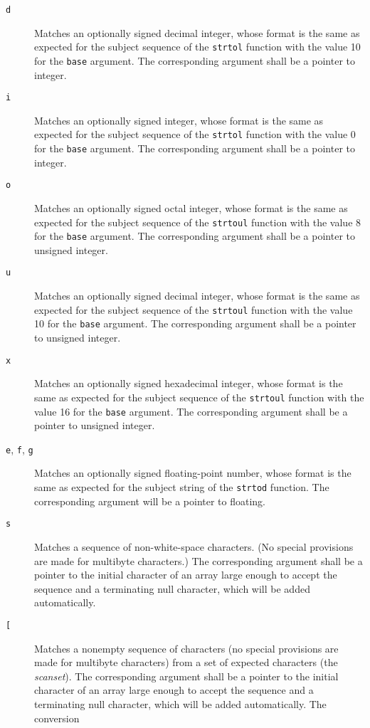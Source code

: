\begin{description}
	\item[\texttt{d}] Matches an optionally signed decimal integer, whose
format is the same as expected for the subject sequence of the \texttt{strtol}
function with the value 10 for the \texttt{base} argument. The corresponding
argument shall be a pointer to integer.
	\item[\texttt{i}] Matches an optionally signed integer, whose format is the
same as expected for the subject sequence of the \texttt{strtol} function with
the value 0 for the \texttt{base} argument. The corresponding argument shall be
a pointer to integer.
	\item[\texttt{o}] Matches an optionally signed octal integer, whose format
is the same as expected for the subject sequence of the \texttt{strtoul}
function with the value 8 for the \texttt{base} argument. The corresponding
argument shall be a pointer to unsigned integer.
	\item[\texttt{u}] Matches an optionally signed decimal integer, whose
format is the same as expected for the subject sequence of the \texttt{strtoul}
function with the value 10 for the \texttt{base} argument. The corresponding
argument shall be a pointer to unsigned integer.
	\item[\texttt{x}] Matches an optionally signed hexadecimal integer, whose
format is the same as expected for the subject sequence of the \texttt{strtoul}
function with the value 16 for the \texttt{base} argument. The corresponding
argument shall be a pointer to unsigned integer.
	\item[\texttt{e}, \texttt{f}, \texttt{g}] Matches an optionally signed
floating-point number, whose format is the same as expected for the subject
string of the \texttt{strtod} function. The corresponding argument will be a
pointer to floating.
	\item[\texttt{s}] Matches a sequence of non-white-space characters. (No
special provisions are made for multibyte characters.) The corresponding
argument shall be a pointer to the initial character of an array large enough
to accept the sequence and a terminating null character, which will be added
automatically.
	\item[\texttt{[}] Matches a nonempty sequence of characters (no special
provisions are made for multibyte characters) from a set of expected characters
(the \emph{scanset}). The corresponding argument shall be a pointer to the
initial character of an array large enough to accept the sequence and a
terminating null character, which will be added automatically. The conversion

\end{description}
